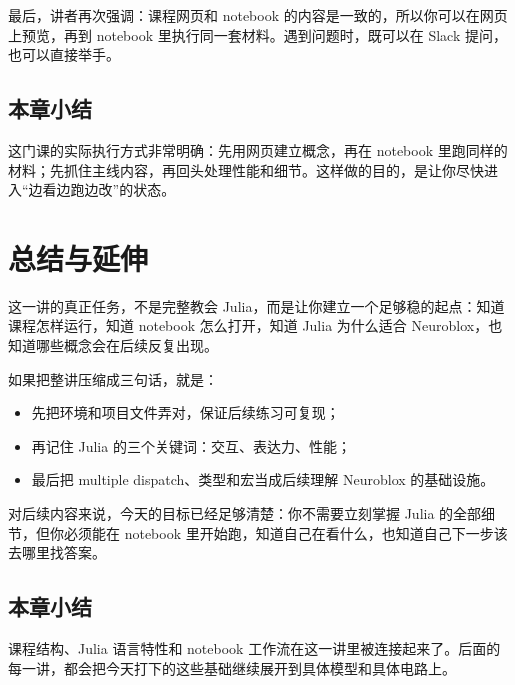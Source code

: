\documentclass[a4paper]{article}
\begin{document}
最后，讲者再次强调：课程网页和 notebook 的内容是一致的，所以你可以在网页上预览，再到 notebook 里执行同一套材料。遇到问题时，既可以在 Slack 提问，也可以直接举手。

\subsection{本章小结}
这门课的实际执行方式非常明确：先用网页建立概念，再在 notebook 里跑同样的材料；先抓住主线内容，再回头处理性能和细节。这样做的目的，是让你尽快进入“边看边跑边改”的状态。

\section{总结与延伸}
这一讲的真正任务，不是完整教会 Julia，而是让你建立一个足够稳的起点：知道课程怎样运行，知道 notebook 怎么打开，知道 Julia 为什么适合 Neuroblox，也知道哪些概念会在后续反复出现。

如果把整讲压缩成三句话，就是：
\begin{itemize}
    \item 先把环境和项目文件弄对，保证后续练习可复现；
    \item 再记住 Julia 的三个关键词：交互、表达力、性能；
    \item 最后把 multiple dispatch、类型和宏当成后续理解 Neuroblox 的基础设施。
\end{itemize}

对后续内容来说，今天的目标已经足够清楚：你不需要立刻掌握 Julia 的全部细节，但你必须能在 notebook 里开始跑，知道自己在看什么，也知道自己下一步该去哪里找答案。

\subsection{本章小结}
课程结构、Julia 语言特性和 notebook 工作流在这一讲里被连接起来了。后面的每一讲，都会把今天打下的这些基础继续展开到具体模型和具体电路上。
\end{document}
